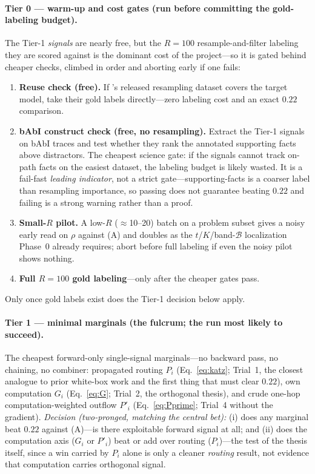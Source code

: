\documentclass[11pt]{article}
\begin{document}
\paragraph{Tier 0 --- warm-up and cost gates (run before committing the gold-labeling budget).}
The Tier-1 \emph{signals} are nearly free, but the $R{=}100$ resample-and-filter labeling they are
scored against is the dominant cost of the project---so it is gated behind cheaper checks, climbed in
order and aborting early if one fails:
\begin{enumerate}[leftmargin=1.6em,itemsep=2pt]
\item \textbf{Reuse check (free).} If \cite{bogdan2025thought}'s released resampling dataset covers the
target model, take their gold labels directly---zero labeling cost and an exact $0.22$ comparison.
\item \textbf{bAbI construct check (free, no resampling).} Extract the Tier-1 signals on bAbI traces and
test whether they rank the annotated supporting facts above distractors. The cheapest science gate: if
the signals cannot track on-path facts on the easiest dataset, the labeling budget is likely wasted.
It is a fail-fast \emph{leading indicator}, not a strict gate---supporting-facts is a coarser label
than resampling importance, so passing does not guarantee beating $0.22$ and failing is a strong
warning rather than a proof.
\item \textbf{Small-$R$ pilot.} A low-$R$ ($\approx$10--20) batch on a problem subset gives a noisy
early read on $\rho$ against (A) and doubles as the $t$/$K$/band-$\mathcal B$ localization Phase~0
already requires; abort before full labeling if even the noisy pilot shows nothing.
\item \textbf{Full $R{=}100$ gold labeling}---only after the cheaper gates pass.
\end{enumerate}
Only once gold labels exist does the Tier-1 decision below apply.

\paragraph{Tier 1 --- minimal marginals (the fulcrum; the run most likely to succeed).}
The cheapest forward-only single-signal marginals---no backward pass, no chaining, no combiner:
propagated routing $P_i$ (Eq.~\ref{eq:katz}; Trial~1, the closest analogue to prior white-box work and
the first thing that must clear $0.22$), own computation $G_i$ (Eq.~\ref{eq:G}; Trial~2, the orthogonal
thesis), and crude one-hop computation-weighted outflow $P'_i$ (Eq.~\ref{eq:Pprime}; Trial~4 without the
gradient). \emph{Decision (two-pronged, matching the central bet):} (i) does any marginal beat $0.22$
against (A)---is there exploitable forward signal at all; and (ii) does the computation axis ($G_i$ or
$P'_i$) beat or add over routing ($P_i$)---the test of the thesis itself, since a win carried by $P_i$
alone is only a cleaner \emph{routing} result, not evidence that computation carries orthogonal signal.
\end{document}

